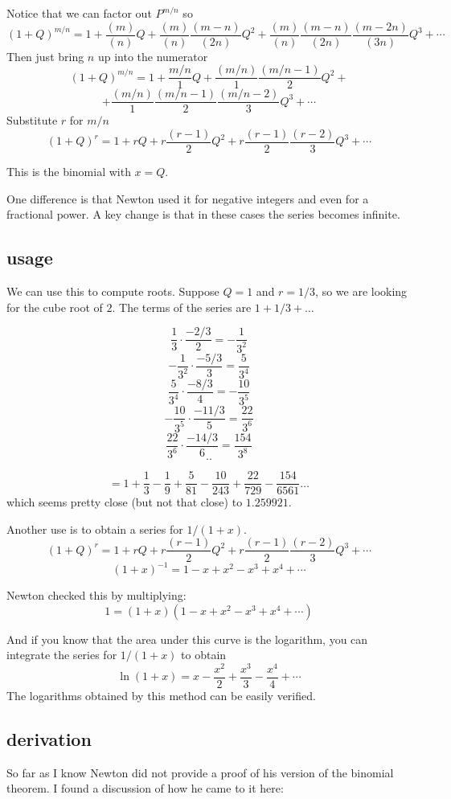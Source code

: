 \documentclass[11pt, oneside]{article}
\begin{document}
Notice that we can factor out $P^{m/n}$ so
\[ (1 + Q)^{m/n} = 1 + \frac{(m)}{(n)} Q  + \frac{(m)}{(n)} \frac{(m-n)}{(2n)} Q^2 + \frac{(m)}{(n)} \frac{(m-n)}{(2n)} \frac{(m-2n)}{(3n)} Q^3 + \cdots \] 
Then just bring $n$ up into the numerator
\[ (1 + Q)^{m/n} = 1 + \frac{m/n}{1} Q  + \frac{(m/n)}{1} \frac{(m/n-1)}{2} Q^2 + \]
\[ + \frac{(m/n)}{1} \frac{(m/n-1)}{2} \frac{(m/n-2)}{3} Q^3 + \cdots \] 
Substitute $r$ for $m/n$
\[ (1 + Q)^r = 1 + r Q  + r \frac{(r-1)}{2} Q^2 + r \frac{(r-1)}{2} \frac{(r-2)}{3} Q^3 + \cdots \] 

This is the binomial with $x = Q$.

One difference is that Newton used it for negative integers and even for a fractional power.  A key change is that in these cases the series becomes infinite.

\subsection*{usage}
We can use this to compute roots.  Suppose $Q = 1$ and $r = 1/3$, so we are looking for the cube root of $2$.  The terms of the series are $1 + 1/3 + \dots$

\[ \frac{1}{3} \cdot \frac{-2/3}{2} = - \frac{1}{3^2} \]
\[ - \frac{1}{3^2} \cdot \frac{-5/3}{3} = \frac{5}{3^4} \]
\[  \frac{5}{3^4} \cdot \frac{-8/3}{4} = -\frac{10}{3^5} \]
\[ -\frac{10}{3^5} \cdot \frac{-11/3}{5} = \frac{22}{3^6} \]
\[  \frac{22}{3^6} \cdot \frac{-14/3}{6} = \frac{154}{3^8} \]
\[ .. \]


\[ = 1 + \frac{1}{3} - \frac{1}{9} + \frac{5}{81} - \frac{10}{243} + \frac{22}{729} - \frac{154}{6561} \dots  \]
which seems pretty close (but not that close) to $1.259921$.

Another use is to obtain a series for $1/(1+x)$.
\[ (1 + Q)^r = 1 + rQ + r\frac{(r-1)}{2}Q^2 + r\frac{(r-1)}{2}\frac{(r-2)}{3}Q^3 + \cdots \]
\[ (1+x)^{-1} = 1 - x + x^2 - x^3 + x^4 + \cdots  \]

Newton checked this by multiplying:
\[ 1 = (1+x)(1 - x + x^2 - x^3 + x^4 + \cdots)  \]

And if you know that the area under this curve is the logarithm, you can integrate the series for $1/(1+x)$ to obtain
\[ \ln(1+x) = x - \frac{x^2}{2} + \frac{x^3}{3} - \frac{x^4}{4} + \cdots \]
The logarithms obtained by this method can be easily verified.

\subsection*{derivation}
So far as I know Newton did not provide a proof of his version of the binomial theorem.  I found a discussion of how he came to it here:
\end{document}
